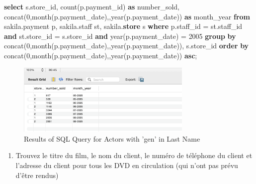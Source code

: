\documentclass[12pt, french]{article}
\providecommand{\tightlist}{%
      \setlength{\itemsep}{0pt}\setlength{\parskip}{0pt}}
\newenvironment{Shaded}{}{}
\newcommand{\KeywordTok}[1]{\textcolor[rgb]{0.00,0.44,0.13}{\textbf{{#1}}}}
\newcommand{\DataTypeTok}[1]{\textcolor[rgb]{0.56,0.13,0.00}{{#1}}}
\newcommand{\DecValTok}[1]{\textcolor[rgb]{0.25,0.63,0.44}{{#1}}}
\newcommand{\StringTok}[1]{\textcolor[rgb]{0.25,0.44,0.63}{{#1}}}
\newcommand{\FunctionTok}[1]{\textcolor[rgb]{0.02,0.16,0.49}{{#1}}}
\newcommand{\NormalTok}[1]{{#1}}
\newcommand{\OperatorTok}[1]{\textcolor[rgb]{0.40,0.40,0.40}{{#1}}}
\begin{document}
\begin{Shaded}
\begin{Highlighting}[]
\KeywordTok{select}\NormalTok{ s.store\_id, }\FunctionTok{count}\NormalTok{(p.payment\_id) }\KeywordTok{as}\NormalTok{ number\_sold, }\FunctionTok{concat}\NormalTok{(}\StringTok{\textquotesingle{}0\textquotesingle{}}\NormalTok{,}\DataTypeTok{month}\NormalTok{(p.payment\_date),}\StringTok{\textquotesingle{}{-}\textquotesingle{}}\NormalTok{,}\DataTypeTok{year}\NormalTok{(p.payment\_date)) }\KeywordTok{as}\NormalTok{ month\_year}
\KeywordTok{from}\NormalTok{ sakila.payment p, sakila.staff st, sakila.}\KeywordTok{store}\NormalTok{ s}
\KeywordTok{where} 
\NormalTok{    p.staff\_id }\OperatorTok{=}\NormalTok{ st.staff\_id }
    \KeywordTok{and}\NormalTok{ st.store\_id }\OperatorTok{=}\NormalTok{ s.store\_id}
    \KeywordTok{and} \DataTypeTok{year}\NormalTok{(p.payment\_date) }\OperatorTok{=} \DecValTok{2005}
\KeywordTok{group} \KeywordTok{by} \FunctionTok{concat}\NormalTok{(}\StringTok{\textquotesingle{}0\textquotesingle{}}\NormalTok{,}\DataTypeTok{month}\NormalTok{(p.payment\_date),}\StringTok{\textquotesingle{}{-}\textquotesingle{}}\NormalTok{,}\DataTypeTok{year}\NormalTok{(p.payment\_date)), s.store\_id}
\KeywordTok{order} \KeywordTok{by} \FunctionTok{concat}\NormalTok{(}\StringTok{\textquotesingle{}0\textquotesingle{}}\NormalTok{,}\DataTypeTok{month}\NormalTok{(p.payment\_date),}\StringTok{\textquotesingle{}{-}\textquotesingle{}}\NormalTok{,}\DataTypeTok{year}\NormalTok{(p.payment\_date)) }\KeywordTok{asc}\NormalTok{;}
\end{Highlighting}
\end{Shaded}


\begin{figure}[H] %
    \centering
    \includegraphics[width=0.75\textwidth]{res/Q8.png}
    \caption{Results of SQL Query for Actors with 'gen' in Last Name}
    \label{fig:actors_with_gen}
\end{figure}


\begin{enumerate}
\def\labelenumi{\arabic{enumi}.}
\setcounter{enumi}{8}
\tightlist
\item
  Trouvez le titre du film, le nom du client, le numéro de téléphone du
  client et l'adresse du client pour tous les DVD en circulation (qui
  n'ont pas prévu d'être rendus)
\end{enumerate}
\end{document}
